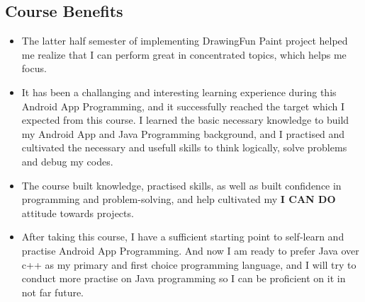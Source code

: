 \documentclass[9pt,b5paper]{article}
\begin{document}
\subsection{Course Benefits}
\label{sec-7-2}
\begin{itemize}
\item The latter half semester of implementing DrawingFun Paint project helped me realize that I can perform great in concentrated topics, which helps me focus.
\item It has been a challanging and interesting learning experience during this Android App Programming, and it successfully reached the target which I expected from this course. I learned the basic necessary knowledge to build my Android App and Java Programming background, and I practised and cultivated the necessary and usefull skills to think logically, solve problems and debug my codes.
\item The course built knowledge, practised skills, as well as built confidence in programming and problem-solving, and help cultivated my \textbf{I CAN DO} attitude towards projects.
\item After taking this course, I have a sufficient starting point to self-learn and practise Android App Programming. And now I am ready to prefer Java over c++ as my primary and first choice programming language, and I will try to conduct more practise on Java programming so I can be proficient on it in not far future.
\end{itemize}
\end{document}
